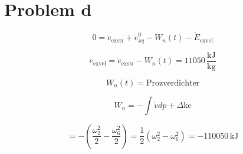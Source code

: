 \section*{Problem d}

\[
0 = \dot{e}_{\text{exstr}} + \dot{e}_{xq}^0 - W_n(t) - \dot{E}_{\text{exvel}}
\]

\[
\dot{e}_{\text{exvel}} = \dot{e}_{\text{exstr}} - W_n(t) = 11050 \, \frac{\text{kJ}}{\text{kg}}
\]

\[
W_n(t) = \text{Prozverdichter}
\]

\[
W_n = -\int \dot{v} dp + \Delta \text{ke}
\]

\[
= -\left( \frac{\omega_2^2}{2} - \frac{\omega_6^2}{2} \right) = \frac{1}{2} (\omega_2^2 - \omega_6^2) = -110050 \, \text{kJ}
\]
